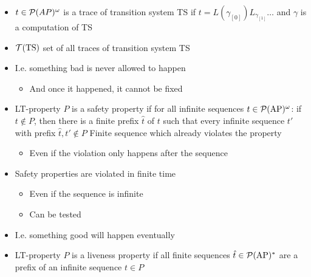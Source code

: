 \begin{itemize}
\begin{itemize}
\begin{itemize}
\begin{itemize}
                        \end{itemize}
                    \item $t \in \mathcal{P}(AP)^\omega$ is a trace of transition system TS if $t = L(\gamma_{[0]})L_{\gamma_{[1]}} \dots$ and $\gamma$ is a computation of TS
                    \item $\mathcal{T}(\text{TS})$ set of all traces of transition system TS
                \end{itemize}
                \begin{itemize}
                    \item I.e. something bad is never allowed to happen
                        \begin{itemize}
                            \item And once it happened, it cannot be fixed
                        \end{itemize}
                    \item LT-property $P$ is a safety property if for all infinite sequences $t \in \mathcal{P}(\text{AP})^\omega$: if $t \notin P$, then there is a finite prefix $\hat{t}$ of $t$ such that every infinite sequence $t'$ with prefix $\hat{t}, t' \notin P$
                     Finite sequence which already violates the property
                        \begin{itemize}
                            \item Even if the violation only happens after the sequence
                        \end{itemize}
                    \item Safety properties are violated in finite time
                        \begin{itemize}
                            \item Even if the sequence is infinite
                            \item Can be tested
                        \end{itemize}
                \end{itemize}
                \begin{itemize}
                    \item I.e. something good will happen eventually
                    \item LT-property $P$ is a liveness property if all finite sequences $\hat{t} \in \mathcal{P}(\text{AP})^*$ are a prefix of an infinite sequence $t \in P$

\end{itemize}
\end{itemize}
\end{itemize}
